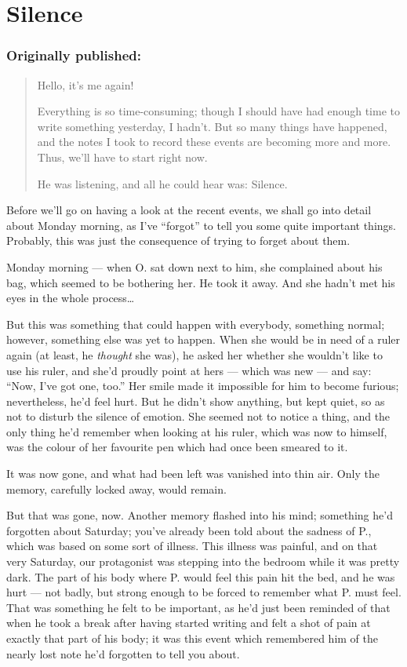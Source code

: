 \chapter{Silence}
\label{cha:silence}
\subsection*{Originally published: }
\begin{quote}
Hello, it's me again!

Everything is so time-consuming; though I should have had enough time to write something yesterday, I hadn't. But so many things have happened, and the notes I took to record these events are becoming more and more. 
Thus, we'll have to start right now.

He was listening, and all he could hear was: Silence.
\end{quote}

Before we'll go on having a look at the recent events, we shall go into detail about Monday morning, as I've \enquote{forgot} to tell you some quite important things. Probably, this was just the consequence of trying to forget about them.

Monday morning --- when O. sat down next to him, she complained about his bag, which seemed to be bothering her. He took it away. And she hadn't met his eyes in the whole process\ldots

But this was something that could happen with everybody, something normal; however, something else was yet to happen. When she would be in need of a ruler again (at least, he \emph{thought} she was), he asked her whether she wouldn't like to use his ruler, and she'd proudly point at hers --- which was new --- and say: \enquote{Now, I've got one, too.} Her smile made it impossible for him to become furious; nevertheless, he'd feel hurt. But he didn't show anything, but kept quiet, so as not to disturb the silence of emotion. She seemed not to notice a thing, and the only thing he'd remember when looking at his ruler, which was now to himself, was the colour of her favourite pen which had once been smeared to it.

It was now gone, and what had been left was vanished into thin air. Only the memory, carefully locked away, would remain.

But that was gone, now. Another memory flashed into his mind; something he'd forgotten about Saturday; you've already been told about the sadness of P., which was based on some sort of illness. This illness was painful, and on that very Saturday, our protagonist was stepping into the bedroom while it was pretty dark. The part of his body where P. would feel this pain hit the bed, and he was hurt --- not badly, but strong enough to be forced to remember what P. must feel. That was something he felt to be important, as he'd just been reminded of that when he took a break after having started writing and felt a shot of pain at exactly that part of his body; it was this event which remembered him of the nearly lost note he'd forgotten to tell you about.

